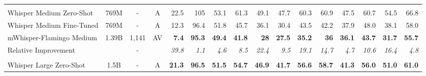 \begin{table*}[t]
{\begin{tabular}{lcccrrrrrrrrrrrr}
\hline
\rowcolor{Gray}\multicolumn{16}{c}{\it{Medium Models}} \\
Whisper Medium Zero-Shot & 769M & - & A & 22.5 & 105 & 53.1 & 61.3 & 49.1 & 47.7 & 60.3 & 60.9 & 47.5 & 60.7 & 54.5 & 66.8 \\
Whisper Medium Fine-Tuned & 769M & - & A & 12.3 & 96.4 & 51.8 & 45.7 & 36.1 & 30.4 & 43.5 & 42.2 & 37.9 & 48.0 & 38.1 & 58.0 \\
mWhisper-Flamingo Medium & 1.39B & \multicolumn{1}{r}{1,141} & AV & \bf{7.4} & \bf{95.3} & \bf{49.4} & \bf{41.8} & \bf{28} & \bf{27.5} & \bf{35.2} & \bf{36} & \bf{36.1} & \bf{43.7} & \bf{31.7} & \bf{55.7} \\
Relative Improvement &  & - &  & \it{39.8} & \it{1.1} & \it{4.6} & \it{8.5} & \it{22.4} & \it{9.5} & \it{19.1} & \it{14.7} & \it{4.7} & \it{10.6} & \it{16.4} & \it{4.8} \\
\hline
\rowcolor{Gray}\multicolumn{16}{c}{\it{Large Models}} \\
Whisper Large Zero-Shot & 1.5B & - & A & \bf{21.3} & \bf{96.5} & \bf{51.5} & \bf{54.7} & \bf{46.9} & \bf{41.7} & \bf{56.6} & \bf{58.7} & \bf{41.3} & \bf{56.0} & \bf{51.0} & \bf{61.0}\\
\bottomrule
\end{tabular}%
}
\vspace{-0.4cm}
\end{table*}
